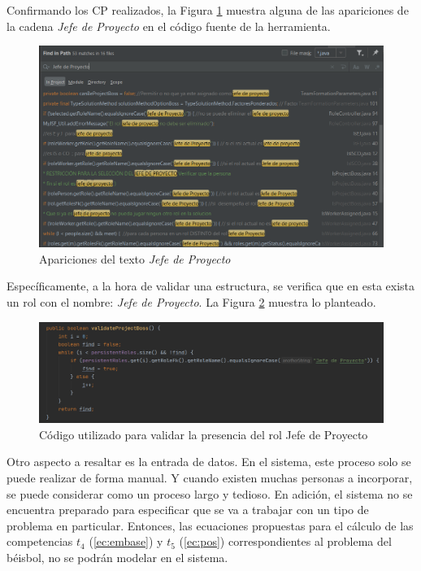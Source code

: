 Confirmando los CP realizados, la Figura \ref{fig:apariciones-jefe-proy} muestra alguna de las apariciones de la cadena \textit{Jefe de Proyecto} en el código fuente de la herramienta.

\begin{figure}[H]
	\centering
	\includegraphics[width=\textwidth]{figuras/string-texto-jefe-proy.png}
	\caption{Apariciones del texto \textit{Jefe de Proyecto}} \label{fig:apariciones-jefe-proy}
\end{figure}

Específicamente, a la hora de validar una estructura, se verifica que en esta exista un rol con el nombre: \textit{Jefe de Proyecto}. La Figura \ref{fig:cod-valida} muestra lo planteado.

\begin{figure}[H]
	\centering
	\includegraphics[width=\textwidth]{figuras/validate-state.png}
	\caption{Código utilizado para validar la presencia del rol Jefe de Proyecto} \label{fig:cod-valida}
\end{figure}

Otro aspecto a resaltar es la entrada de datos. En el sistema, este proceso solo se puede realizar de forma manual. Y cuando existen muchas personas a incorporar, se puede considerar como un proceso largo y tedioso. En adición, el sistema no se encuentra preparado para especificar que se va a trabajar con un tipo de problema en particular. Entonces, las ecuaciones propuestas para el cálculo de las competencias $t_4$ (\ref{ec:embase}) y $t_5$ (\ref{ec:pos}) correspondientes al problema del béisbol, no se podrán modelar en el sistema. \\\\


